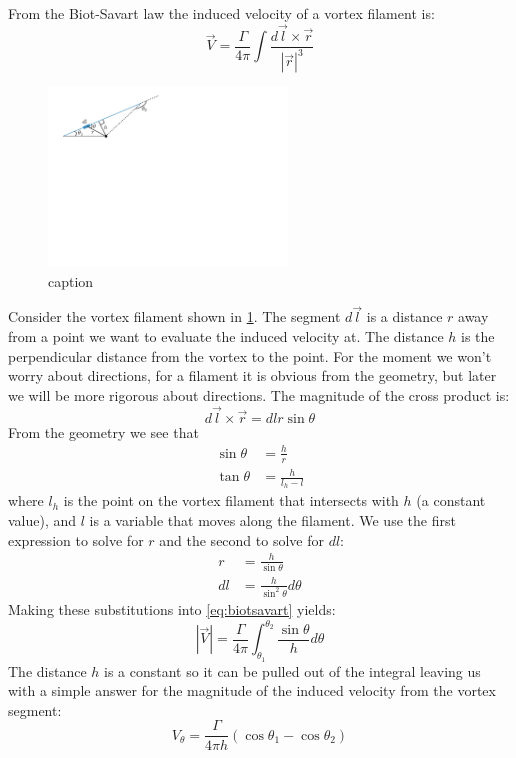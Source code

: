 \documentclass{article}
\begin{document}
From the Biot-Savart law the induced velocity of a vortex filament is:
\begin{equation}
\vec{V} = \frac{\Gamma}{4 \pi} \int \frac{d \vec{l} \times \vec{r}}{|\vec{r}|^3}
\label{eq:biotsavart}
\end{equation}
\begin{figure}[htbp]
\centering
\includegraphics[width=2.5in]{figs/filament}
\caption{caption}
\label{fig:filament}
\end{figure}
Consider the vortex filament shown in \cref{fig:filament}.  The segment $d\vec{l}$ is a distance $r$ away from a point we want to evaluate the induced velocity at.  The distance $h$ is the perpendicular distance from the vortex to the point.  For the moment we won't worry about directions, for a filament it is obvious from the geometry, but later we will be more rigorous about directions.  
The magnitude of the cross product is:
\begin{equation}
d\vec{l} \times \vec{r} = dl r \sin\theta
\end{equation}
From the geometry we see that 
\begin{align}
\sin\theta &= \frac{h}{r}\\
\tan\theta &= \frac{h}{l_h - l}
\end{align}
where $l_h$ is the point on the vortex filament that intersects with $h$ (a constant value), and $l$ is a variable that moves along the filament.  We use the first expression to solve for $r$ and the second to solve for $dl$:
\begin{align}
r &= \frac{h}{\sin\theta}\\
dl &= \frac{h}{\sin^2\theta} d\theta
\end{align}
Making these substitutions into \cref{eq:biotsavart} yields:
\begin{equation}
|\vec{V}| = \frac{\Gamma}{4 \pi} \int_{\theta_1}^{\theta_2} \frac{\sin\theta}{h} d\theta
\end{equation}
The distance $h$ is a constant so it can be pulled out of the integral leaving us with a simple answer for the magnitude of the induced velocity from the vortex segment:
\begin{equation}
V_\theta = \frac{\Gamma}{4 \pi h}(\cos\theta_1 - \cos\theta_2)
\end{equation}
\end{document}
